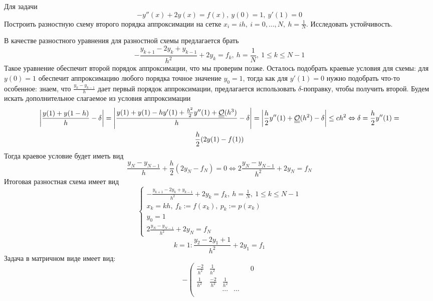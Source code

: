 \begin{task}
  Для задачи
  \[-y''(x) +2y(x) = f(x),\ y(0) = 1,\ y'(1) = 0 \]
  Построить разностную схему второго порядка аппроксимации на
  сетке $x_i=ih,\ i=0,\ldots,N,\ h=\frac{1}{N}$. Исследовать устойчивость.

  В качестве разностного уравнения для разностной схемы предлагается брать
  \[-\frac{y_{k+1}-2y_k+y_{k-1}}{h^2}+2y_k = f_k,\ h = \frac{1}{N},\ 1 \leq k \leq N-1\]
  Такое уравнение обеспечит второй порядок аппроксимации, что мы проверим позже.
  Осталось подобрать краевые условия для схемы: для $y(0)=1$ обеспечит аппроксимацию
  любого порядка точное значение $y_0=1$, тогда как для $y'(1)=0$ нужно
  подобрать что-то особенное: знаем, что $\frac{y_k-y_{k-1}}{h}$ дает
  первый порядок аппроксимации, предлагается использовать $\delta$-поправку,
  чтобы получить второй. Будем искать дополнительное слагаемое из условия аппроксимации
  \begin{multline*}
    \left\lvert\frac{y(1)+y(1-h)}{h}-\delta\right\rvert=\left\lvert\frac{y(1)+y(1)-hy'(1)+\frac{h^2}{2}y''(1)+\underline{\underline{\mathcal{O}}}(h^3)}{h}-\delta\right\rvert=\left\lvert\frac{h}{2}y''(1)+\underline{\underline{\mathcal{O}}}(h^2)-\delta\right\rvert\leq ch^2\Leftrightarrow\delta=\frac{h}{2}y''(1)= \\
    \frac{h}{2}(2y(1)-f(1))
  \end{multline*}
  Тогда краевое условие будет иметь вид
  \[\frac{y_N-y_{N-1}}{h}+\frac{h}{2}(2y_N-f_N)=0\Leftrightarrow 2\frac{y_N-y_{N-1}}{h^2}+2y_N=f_N\]
  Итоговая разностная схема имеет вид
  \[\begin{cases}
      -\frac{y_{k+1}-2y_k+y_{k-1}}{h^2}+2y_k = f_k,\ h = \frac{1}{N},\ 1 \leq k \leq N-1 \\
      x_k = kh,\ f_k := f(x_k),\ p_k := p(x_k)                                           \\
      y_0 = 1                                                                            \\
      2\frac{y_N-y_{N-1}}{h^2}+2y_N=f_N
    \end{cases}\]
  \[k=1: \frac{y_{2}-2y_1+1}{h^2}+2y_1 = f_1\]
  Задача в матричном виде имеет вид:
  \[
    -\left(\begin{array}{cccccc}
        \frac{-2}{h^2} & \frac{1}{h^2}  &               &               &                & 0              \\
        \frac{1}{h^2}  & \frac{-2}{h^2} & \frac{1}{h^2} &               &                &                \\
                       &                & \cdots        & \cdots        &                &                \\

\end{array}\]
\end{task}
